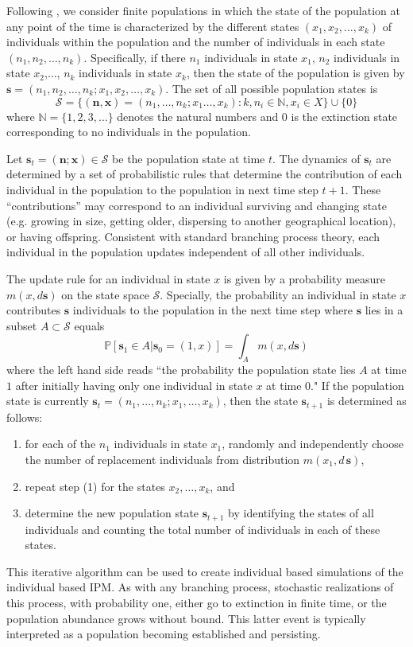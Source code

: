 \documentclass[12pt]{amsart}\usepackage[]{graphicx}\usepackage[]{color}
\def\N{\mathbb N}
\def\P{\mathbb P}
\def\N{\mathbb N}
\def\S{\mathcal S}
\def\n{\mathbf n}
\def\x{\mathbf x}
\def\s{\mathbf s}
\begin{document}
Following \citet{harris-63},  we consider finite populations in which the state of the population at any point of the time is characterized by the different states $(x_1,x_2,\dots, x_k)$  of individuals within the population and the number of individuals in each state $(n_1,n_2,\dots, n_k)$. Specifically, if there $n_1$ individuals in state $x_1$, $n_2$ individuals in state $x_2$,..., $n_k$ individuals in state $x_k$, then the state of the population is given by $\s=(n_1,n_2,\dots, n_k; x_1,x_2,\dots, x_k)$. The set of all possible population states is
\[
\S= \{(\n,\x)=(n_1,\dots, n_k; x_1\dots , x_k): k,n_i\in \N, x_i \in X\} \cup \{0\}
\]
where $\N=\{1,2,3,\dots\}$ denotes the natural numbers and $0$ is the extinction state corresponding to no individuals in the population.

Let  $\s_t=( \n; \x)\in \S$ be the population state at time $t$. The dynamics of $\s_t$ are determined by a set of probabilistic rules that determine the contribution of each individual in the population to the population in next time step $t+1$. These ``contributions'' may correspond to an individual surviving and changing state (e.g. growing in size, getting older, dispersing to another geographical location), or having offspring.  Consistent with standard branching process theory, each individual in the population updates independent of all other individuals.

The update rule for an individual in state $x$ is given by a probability measure $m(x,d\s)$ on the state space $\S$. Specially, the probability an individual in state $x$ contributes $\s$ individuals to the population in the next time step where $\s$ lies in a subset $A\subset \S$ equals
\[
\P[\s_1\in A| \s_0 =(1,x)]=\int_A m(x,d\s)
\]
where the left hand side reads ``the probability the population state lies $A$ at time $1$ after initially having only one individual in state $x$ at time $0$." If the population state is currently $\s_t=(n_1,\dots,n_k;x_1,\dots,x_k)$, then the state $\s_{t+1}$ is determined as follows:
\begin{enumerate}
\item for each of the $n_1$ individuals in state $x_1$, randomly and independently choose the number of replacement individuals from distribution $m(x_1,d\,\s)$,
\item repeat step (1) for the states $x_2,\dots, x_k$, and
\item determine the new population state $\s_{t+1}$ by identifying the states of all individuals and counting the total number of individuals in each of these states.
\end{enumerate}
This iterative algorithm can be used to create individual based simulations of the individual based IPM. As with any branching process, stochastic realizations of this process, with probability one, either go to extinction in finite time, or the population abundance grows without bound. This latter event is typically interpreted as a population becoming established and persisting.
\end{document}
